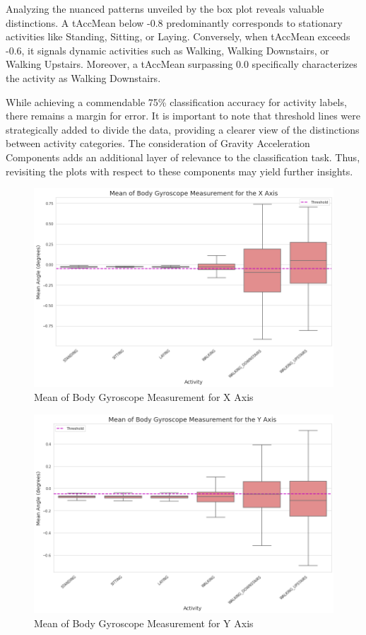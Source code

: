\documentclass[conference]{IEEEtran}
\begin{document}
Analyzing the nuanced patterns unveiled by the box plot reveals valuable distinctions. A tAccMean below -0.8 predominantly corresponds to stationary activities like Standing, Sitting, or Laying. Conversely, when tAccMean exceeds -0.6, it signals dynamic activities such as Walking, Walking Downstairs, or Walking Upstairs. Moreover, a tAccMean surpassing 0.0 specifically characterizes the activity as Walking Downstairs.

While achieving a commendable 75\% classification accuracy for activity labels, there remains a margin for error. It is important to note that threshold lines were strategically added to divide the data, providing a clearer view of the distinctions between activity categories. The consideration of Gravity Acceleration Components adds an additional layer of relevance to the classification task. Thus, revisiting the plots with respect to these components may yield further insights.

\begin{figure}[h!]
	\includegraphics[width= 1.0 \linewidth]{mean_body_gyroscope_x.png}
	\centering
	\caption{Mean of Body Gyroscope Measurement for X Axis}
	\label{mean_body_gyroscope_x.png}
\end{figure}

\begin{figure}[h!]
	\includegraphics[width= 1.0 \linewidth]{mean_body_gyroscope_y.png}
	\centering
	\caption{Mean of Body Gyroscope Measurement for Y Axis}
	\label{mean_body_gyroscope_y.png}
\end{figure}
\end{document}
